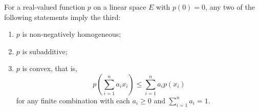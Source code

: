 For a real-valued function $p$ on a linear space $E$ with $p(0) = 0$, any two of the following statements imply the third:

\begin{enumerate}
\item[(i)] $p$ is non-negatively homogeneous;
\item[(ii)] $p$ is subadditive;
\item[(iii)] $p$ is convex, that is,
$$
p\left(\sum_{i=1}^{n} a_i x_i\right) \leq \sum_{i=1}^{n} a_i p(x_i)
$$
for any finite combination with each $a_i \geq 0$ and $\sum_{i=1}^{n} a_i = 1$.
\end{enumerate}
